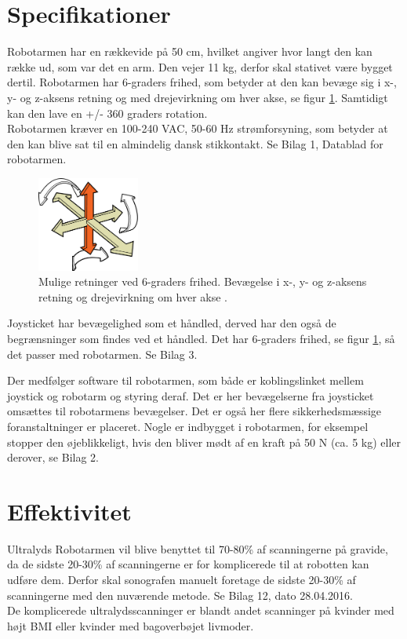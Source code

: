 \section{Specifikationer}
Robotarmen har en rækkevide på 50 cm, hvilket angiver hvor langt den kan række ud, som var det en arm. Den vejer 11 kg, derfor skal stativet være bygget dertil. Robotarmen har 6-graders frihed, som betyder at den kan bevæge sig i x-, y- og z-aksens retning og med drejevirkning om hver akse, se figur \ref{seksgradersfrihed}. Samtidigt kan den lave en +/- 360 graders rotation. \\
Robotarmen kræver en 100-240 VAC, 50-60 Hz strømforsyning, som betyder at den kan blive sat til en almindelig dansk stikkontakt. Se Bilag 1, Datablad for robotarmen.
  
\begin{figure}[H]\centering
	\includegraphics[width = 0.3\textwidth]{Figurer/sixDegressOfFreedom.jpg}
	\caption{Mulige retninger ved 6-graders frihed. Bevægelse i x-, y- og z-aksens retning og drejevirkning om hver akse \cite{6gradersfrihed}. }
	\label{seksgradersfrihed}
\end{figure}

Joysticket har bevægelighed som et håndled, derved har den også de begrænsninger som findes ved et håndled. Det har 6-graders frihed, se figur \ref{seksgradersfrihed}, så det passer med robotarmen. Se Bilag 3. 

Der medfølger software til robotarmen, som både er koblingslinket mellem joystick og robotarm og styring deraf. Det er her bevægelserne fra joysticket omsættes til robotarmens bevægelser. Det er også her flere sikkerhedsmæssige foranstaltninger er placeret. Nogle er indbygget i robotarmen, for eksempel stopper den øjeblikkeligt, hvis den bliver mødt af en kraft på 50 N (ca. 5 kg) eller derover, se Bilag 2.    

\section{Effektivitet}
Ultralyds Robotarmen vil blive benyttet til 70-80\% af scanningerne på gravide, da de sidste 20-30\% af scanningerne er for komplicerede til at robotten kan udføre dem. Derfor skal sonografen manuelt foretage de sidste 20-30\% af scanningerne med den nuværende metode. Se Bilag 12, dato 28.04.2016. \\ 
De komplicerede ultralydsscanninger er blandt andet scanninger på kvinder med højt BMI eller kvinder med bagoverbøjet livmoder. 
 
